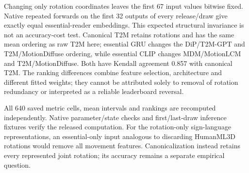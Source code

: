 Changing only rotation coordinates leaves the first 67 input values bitwise fixed. Native repeated forwards on the first 32 outputs of every release/draw give exactly equal essential-reader embeddings. This expected structural invariance is not an accuracy-cost test. Canonical T2M retains rotations and has the same mean ordering as raw T2M here; essential GRU changes the DiP/T2M-GPT and T2M/MotionDiffuse ordering, while essential CLIP changes MDM/MotionLCM and T2M/MotionDiffuse. Both have Kendall agreement 0.857 with canonical T2M. The ranking differences combine feature selection, architecture and different fitted weights; they cannot be attributed solely to removal of rotation redundancy or interpreted as a reliable leaderboard reversal.

All 640 saved metric cells, mean intervals and rankings are recomputed independently. Native parameter/state checks and first/last-draw inference fixtures verify the released computation. For the rotation-only sign-language representations, an essential-only input analogous to discarding HumanML3D rotations would remove all movement features. Canonicalization instead retains every represented joint rotation; its accuracy remains a separate empirical question.
